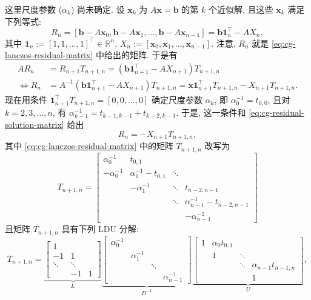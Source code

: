 {这里尺度参数 ($\alpha_k$) 尚未确定. 设 $\bm x_k$ 为 $A\bm x=\bm b$ 的第 $k$ 个近似解, 且这些 $\bm x_k$ 满足下列等式:}
\[R_n=[\bm b-A\bm x_0,\bm b-A\bm x_1,\ldots,\bm b-A\bm x_{n-1}]=\bm b\bm1_n^{\top}-AX_n,\]
{其中 $\bm1_n:=[1,1,\ldots,1]^{\top}\in\mathbb R^n$, $X_n:=[\bm x_0,\bm x_1,\ldots,\bm x_{n-1}]$. 注意, $R_n$ 就是 \eqref{eq:cg-lanczos-residual-matrix} 中给出的矩阵. 于是有}
\begin{equation}\label{eq:cg-residual-solution-matrix}
\begin{aligned}
AR_n&=R_{n+1}T_{n+1,n}=(\bm b\bm1_{n+1}^{\top}-AX_{n+1})T_{n+1,n}\\
\Leftrightarrow R_n&=A^{-1}(\bm b\bm1_{n+1}^{\top}-AX_{n+1})T_{n+1,n}=\bm x\bm1_{n+1}^{\top}T_{n+1,n}-X_{n+1}T_{n+1,n}.
\end{aligned}\end{equation}
{现在用条件 $\bm1_{n+1}^{\top}T_{n+1,n}=[0,0,\ldots,0]$ 确定尺度参数 $\alpha_k$, 即 $\alpha_0^{-1}=t_{0,0}$, 且对 $k=2,3,\ldots,n$, 有 $\alpha_{k-1}^{-1}=t_{k-1,k-1}+t_{k-2,k-1}$. 于是, 这一条件和 \eqref{eq:cg-residual-solution-matrix} 给出}
\begin{equation}\label{eq:cg-residual-negative-product}R_n=-X_{n+1}T_{n+1,n},\end{equation}
{其中 \eqref{eq:cg-lanczos-residual-matrix} 中的矩阵 $T_{n+1,n}$ 改写为}
\[T_{n+1,n}=\begin{bmatrix}
\alpha_0^{-1}&t_{0,1}&&\\-\alpha_0^{-1}&\alpha_1^{-1}-t_{0,1}&\ddots&\\
&-\alpha_1^{-1}&\ddots&t_{n-2,n-1}\\&&\ddots&\alpha_{n-1}^{-1}-t_{n-2,n-1}\\&&&-\alpha_{n-1}^{-1}
\end{bmatrix}\]
{且矩阵 $T_{n+1,n}$ 具有下列 LDU 分解:}
\begin{equation}\label{eq:cg-lanczos-ldu}
T_{n+1,n}=\underbrace{\begin{bmatrix}1&&\\-1&1&\\\ddots&\ddots&\\&-1&1\end{bmatrix}}_L
\underbrace{\begin{bmatrix}\alpha_0^{-1}&&&\\&\alpha_1^{-1}&&\\&&\ddots&\\&&&\alpha_{n-1}^{-1}\end{bmatrix}}_{D^{-1}}
\underbrace{\begin{bmatrix}1&\alpha_0t_{0,1}&&\\&1&\ddots&\\&&\ddots&\alpha_{n-1}t_{n-1,n}\\&&&1\end{bmatrix}}_U,
\end{equation}
